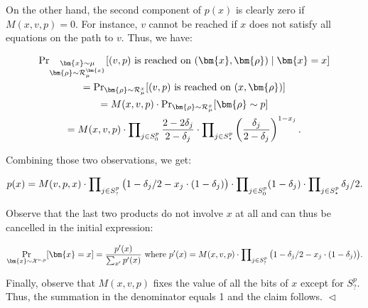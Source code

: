 On the other hand, the second component of $p(x)$ is clearly zero if $M(x,v,p)=0$. For instance, $v$ cannot be reached if $x$ does not satisfy all equations on the path to $v$. Thus, we have:\par


\[\begin{gathered}
\displaystyle\Pr\nolimits_{\begin{subarray}{c}\bm{x}\sim\mu\\
\bm{\rho}\sim\mathcal{R}_{\mu}^{\bm{x}}\end{subarray}}[\text{$(v,p)$ is reached on $(\bm{x},\bm{\rho})$}\mid\bm{x}=x] \\
\displaystyle= \displaystyle\Pr\nolimits_{\bm{\rho}\sim\mathcal{R}_{\mu}^{x}}[\text{$(v,p)$ is reached on $(x,\bm{\rho})$}] \\
\displaystyle= \displaystyle M(x,v,p)\cdot\Pr\nolimits_{\bm{\rho}\sim\mathcal{R}_{\mu}^{x}}[\bm{\rho}\sim p] \\
\displaystyle= \displaystyle M(x,v,p)\cdot\prod\nolimits_{j\in S^{p}_{0}}\frac{2-2\delta_{j}}{2-\delta_{j}}\cdot\prod\nolimits_{j\in S^{p}_{\star}}\left(\frac{\delta_{j}}{2-\delta_{j}}\right)^{1-x_{j}}.
\end{gathered}\]


Combining those two observations, we get:\par


\[\begin{gathered}
p(x)=M(v,p,x)\cdot\prod\nolimits_{j\in S^{p}_{?}}\big{(}1-\delta_{j}/2-x_{j}\cdot(1-\delta_{j})\big{)}\cdot\prod\nolimits_{j\in S^{p}_{0}}(1-\delta_{j})\cdot\prod\nolimits_{j\in S^{p}_{\star}}\delta_{j}/2.
\end{gathered}\]


Observe that the last two products do not involve $x$ at all and can thus be cancelled in the initial expression:\par


\[\begin{gathered}
\displaystyle\Pr_{\bm{x}\sim\mathcal{X}^{v,p}}[\bm{x}=x] \displaystyle=\frac{p^{\prime}(x)}{\sum_{x^{\prime}}p^{\prime}(x)}\text{ where }p^{\prime}(x)=M(x,v,p)\cdot\prod\nolimits_{j\in S^{p}_{?}}\big{(}1-\delta_{j}/2-x_{j}\cdot(1-\delta_{j})\big{)}.
\end{gathered}\]


Finally, observe that $M(x,v,p)$ fixes the value of all the bits of $x$ except for $S^{p}_{?}$. Thus, the summation in the denominator equals 1 and the claim follows.
$\vartriangleleft$\par




\par




